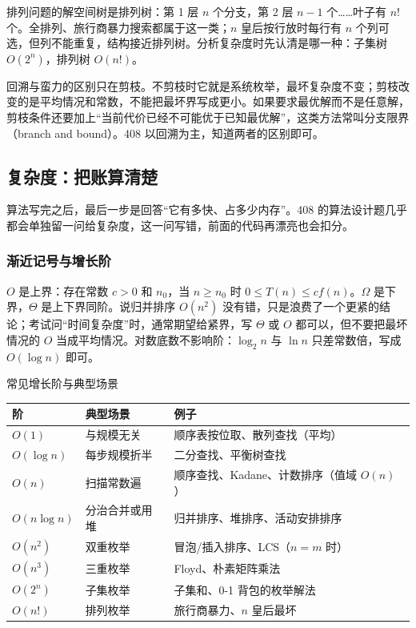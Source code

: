 排列问题的解空间树是排列树：第 1 层 $n$ 个分支，第 2 层 $n-1$ 个……叶子有 $n!$ 个。全排列、旅行商暴力搜索都属于这一类；$n$ 皇后按行放时每行有 $n$ 个列可选，但列不能重复，结构接近排列树。分析复杂度时先认清是哪一种：子集树 $O(2^n)$，排列树 $O(n!)$。

回溯与蛮力的区别只在剪枝。不剪枝时它就是系统枚举，最坏复杂度不变；剪枝改变的是平均情况和常数，不能把最坏界写成更小。如果要求最优解而不是任意解，剪枝条件还要加上“当前代价已经不可能优于已知最优解”，这类方法常叫分支限界（branch and bound）。408 以回溯为主，知道两者的区别即可。

\subsection{复杂度：把账算清楚}

算法写完之后，最后一步是回答“它有多快、占多少内存”。408 的算法设计题几乎都会单独留一问给复杂度，这一问写错，前面的代码再漂亮也会扣分。

\subsubsection{渐近记号与增长阶}

$O$ 是上界：存在常数 $c>0$ 和 $n_0$，当 $n\ge n_0$ 时 $0\le T(n)\le c f(n)$。$\Omega$ 是下界，$\Theta$ 是上下界同阶。说归并排序 $O(n^2)$ 没有错，只是浪费了一个更紧的结论；考试问“时间复杂度”时，通常期望给紧界，写 $\Theta$ 或 $O$ 都可以，但不要把最坏情况的 $O$ 当成平均情况。对数底数不影响阶：$\log_2 n$ 与 $\ln n$ 只差常数倍，写成 $O(\log n)$ 即可。

\begin{tablebox}{常见增长阶与典型场景}
\centering
\begin{tabular}{lll}
\toprule
阶 & 典型场景 & 例子 \\
\midrule
$O(1)$ & 与规模无关 & 顺序表按位取、散列查找（平均）\\
$O(\log n)$ & 每步规模折半 & 二分查找、平衡树查找\\
$O(n)$ & 扫描常数遍 & 顺序查找、Kadane、计数排序（值域 $O(n)$）\\
$O(n\log n)$ & 分治合并或用堆 & 归并排序、堆排序、活动安排排序\\
$O(n^2)$ & 双重枚举 & 冒泡/插入排序、LCS（$n=m$ 时）\\
$O(n^3)$ & 三重枚举 & Floyd、朴素矩阵乘法\\
$O(2^n)$ & 子集枚举 & 子集和、0-1 背包的枚举解法\\
$O(n!)$ & 排列枚举 & 旅行商暴力、$n$ 皇后最坏\\
\bottomrule
\end{tabular}
\end{tablebox}

